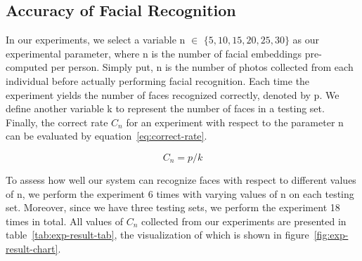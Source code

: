 
\subsection{Accuracy of Facial Recognition}
In our experiments, we select a variable n $\in$ $\{5, 10, 15, 20, 25, 30\}$ as our experimental parameter,
where n is the number of facial embeddings pre-computed per person. Simply put, n is the
number of photos collected from each individual before actually performing facial recognition.
Each time the experiment yields the number of faces recognized correctly, denoted by p.
We define another variable k to represent the number of faces in a testing set.
Finally, the correct rate $C_n$  for an experiment with respect to the parameter n can be evaluated by equation~\ref{eq:correct-rate}.

\begin{equation}
  \label{eq:correct-rate}
  C_n = p / k
\end{equation}

To assess how well our system can recognize faces with respect to different values of n,
we perform the experiment 6 times with varying values of n on each testing set. Moreover,
since we have three testing sets, we perform the experiment 18 times in total.
All values of $C_n$ collected from our experiments are presented in table~\ref{tab:exp-result-tab},
the visualization of which is shown in figure~\ref{fig:exp-result-chart}.
\vspace{0.5cm}

